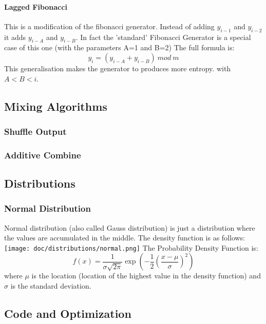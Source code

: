 \documentclass{scrartcl}
\begin{document}
\paragraph{Lagged Fibonacci}
This is a modification of the fibonacci generator.  Instead of adding $y_{i-1}$ and $y_{i-2}$ it adds $y_{i-A}$ and $y_{i-B}$. In fact the 'standard' Fibonacci Generator is a special case of this one (with the parameters A=1 and B=2)\newline
The full formula is:
\begin{equation}y_i = (y_{i-A} + y_{i-B})\:mod\:m\end{equation}
This generalisation makes the generator to produces more entropy.
with $A < B < i$.

\subsection{Mixing Algorithms}
\subsubsection{Shuffle Output}
\subsubsection{Additive Combine}
\subsection{Distributions}
\subsubsection{Normal Distribution}
Normal distribution (also called Gauss distribution) is just a distribution where the values are accumulated in the middle.
The density function is as follows:\newline
\texttt{[image: doc/distributions/normal.png]}\newline
The Probability Density Function is:
\begin{equation} f(x) = \frac {1}{\sigma\sqrt{2\pi}}\exp\left(-\frac {1}{2} \left(\frac{x-\mu}{\sigma}\right)^2\right) \end{equation}
where $\mu$ is the location (location of the highest value in the density function) and $\sigma$ is the standard deviation.
\subsection{Code and Optimization}
\end{document}
